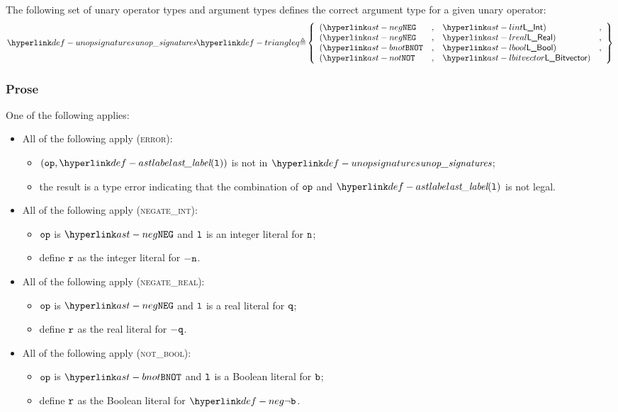 \hypertarget{def-unopsignatures}{}
The following set of unary operator types and argument types defines the correct argument type
for a given unary operator:
\[
\unopsignatures \triangleq
\left\{
\begin{array}{lcll}
  (\NEG   &,& \lint)        &,\\
  (\NEG   &,& \lreal)       &,\\
  (\BNOT  &,& \lbool)       &,\\
  (\NOT   &,& \lbitvector)  &\\
\end{array}
\right\}
\]

\subsubsection{Prose}
One of the following applies:
\begin{itemize}
  \item All of the following apply (\textsc{error}):
  \begin{itemize}
    \item $(\op, \astlabel(\vl))$ is not in $\unopsignatures$;
    \item the result is a type error indicating that the combination of $\texttt{op}$ and $\astlabel(\vl)$
          is not legal.
  \end{itemize}

  \item All of the following apply (\textsc{negate\_int}):
  \begin{itemize}
    \item $\texttt{op}$ is $\NEG$ and $\texttt{l}$ is an integer literal for $\texttt{n}$;
    \item define $\texttt{r}$ as the integer literal for $- \texttt{n}$.
  \end{itemize}

  \item All of the following apply (\textsc{negate\_real}):
  \begin{itemize}
    \item $\texttt{op}$ is $\NEG$ and $\texttt{l}$ is a real literal for $\texttt{q}$;
    \item define $\texttt{r}$ as the real literal for $- \texttt{q}$.
  \end{itemize}

  \item All of the following apply (\textsc{not\_bool}):
  \begin{itemize}
    \item $\texttt{op}$ is $\BNOT$ and $\texttt{l}$ is a Boolean literal for $\texttt{b}$;
    \item define $\texttt{r}$ as the Boolean literal for $\neg\vb$.
  \end{itemize}


\end{itemize}

